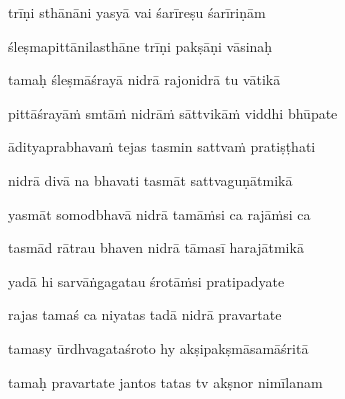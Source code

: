 trīṇi sthānāni yasyā vai śarīreṣu śarīriṇām \veg\dontdisplaylinenum

śleṣmapittānilasthāne trīṇi pakṣāṇi vāsinaḥ\thinspace{\dandab} \dontdisplaylinenum

tamaḥ śleṣmāśrayā nidrā rajonidrā tu vātikā \veg\dontdisplaylinenum

pittāśrayā\.m smtā\.m nidrā\.m sāttvikā\.m viddhi bhūpate\thinspace{\dandab} \dontdisplaylinenum

ādityaprabhava\.m tejas tasmin sattva\.m pratiṣṭhati \veg\dontdisplaylinenum

nidrā divā na bhavati tasmāt sattvaguṇātmikā\thinspace{\dandab} \dontdisplaylinenum

yasmāt somodbhavā nidrā tamā\.msi ca rajā\.msi ca \veg\dontdisplaylinenum

tasmād rātrau bhaven nidrā tāmasī harajātmikā\thinspace{\dandab} \dontdisplaylinenum

yadā hi sarvāṅgagatau śrotā\.msi pratipadyate \veg\dontdisplaylinenum

rajas tamaś ca niyatas tadā nidrā pravartate\thinspace{\dandab} \dontdisplaylinenum

tamasy ūrdhvagataśroto hy akṣipakṣmāsamāśritā \veg\dontdisplaylinenum

tamaḥ pravartate jantos tatas tv akṣnor nimīlanam\thinspace{\dandab} \dontdisplaylinenum

